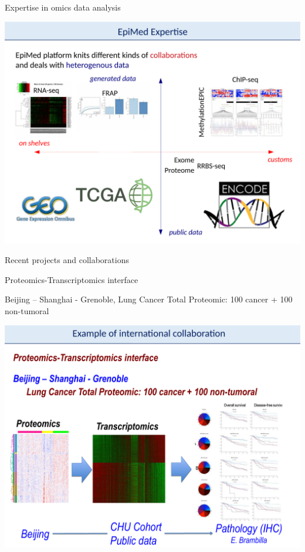 \documentclass[final]{beamer}
\newlength{\twocolwid}
\begin{document}
\begin{frame}[t]
\begin{columns}[t]
\begin{column}{\twocolwid}
\begin{block}{Expertise in omics data analysis}
{
\centering
\mbox{\includegraphics[trim = 0mm 0mm 0mm 43mm, clip, width=.99\linewidth]{figs/fig04}}

}

\end{block}







\begin{block}{Recent projects and collaborations}

Proteomics-Transcriptomics interface

Beijing – Shanghai - Grenoble, Lung Cancer Total Proteomic: 100 cancer + 100 non-tumoral

{
\centering
\mbox{\includegraphics[trim = 0mm 0mm 0mm 63mm, clip, width=\linewidth]{figs/fig06}}
}


\end{block}
\end{column}
\end{columns}
\end{frame}
\end{document}

